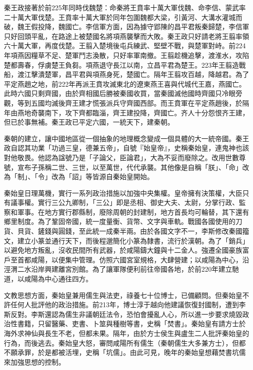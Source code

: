 秦王政接著於前225年同時伐魏楚：命秦將王賁率十萬大軍伐魏、命李信、蒙武率二十萬大軍伐楚。王賁率十萬大軍於同年包圍魏都大梁，引黃河、大溝水灌城而破，魏王假投降，魏國亡。李信軍方面，因為據守郢陳的昌平君叛秦歸楚，李信軍只好回頭平亂，在路途上被楚國名將項燕襲擊而大敗。秦王政只好請老將王翦率領六十萬大軍，再度伐楚。王翦入楚境後屯兵練武、堅壁不戰，與楚軍對峙。前224年項燕因糧草不足、楚軍鬥志渙散，只好率軍南撤。王翦趁機追擊，渡淮水，攻陷楚都壽春，俘虜楚王負芻。項燕退守長江以南，立昌平君為楚王。223年王翦造戰船，渡江擊潰楚軍，昌平君與項燕身死，楚國亡。隔年王翦攻百越，降越君。為了平定燕趙之地，前222年再派王賁攻滅東北的遼東燕王喜與代城代王嘉，燕國亡。此時六國只剩齊國，由於齊相國后勝被秦國收買，當秦國滅他國時齊國只冷眼旁觀，等到五國均滅後齊王建才慌張派兵守齊國西部。而王賁軍在平定燕趙後，於隔年由燕地奇襲南下，攻下齊都臨淄，齊王建投降，齊國亡。齐人十分怨恨齐王建，但已於事無補。秦王政已平定六國，一統天下，建秦朝。

秦朝的建立，讓中國地區從一個抽象的地理概念變成一個具體的大一統帝國。秦王政自認其功業「功過三皇，德兼五帝」，自號『始皇帝』，史稱秦始皇，連鬼神也該對他敬畏。他認為諡號乃是「子論父，臣論君」，大為不妥而廢除之。改用世數尊號，宣布子孫稱二世、三世，以至萬世，代代承襲。其他像是自稱「朕」、「命」改為「制」、「令」改為「詔」等皆源自秦始皇開始。

秦始皇日理萬機，實行一系列政治措施以加強中央集權。皇帝擁有決策權，大臣只有議事權。實行三公九卿制，「三公」即是丞相、御史大夫、太尉，分掌行政、監察和軍事。在地方實行郡縣制，廢除周朝的封建制，地方首長均可輪替，其下還有鄉里制度。為了鞏固帝國，統一度量衡、貨幣、文字與車軌。戰國各國使用的刀貨、貝貨、鏟錢與圓錢，至此統一成秦半兩。由於各國文字不一，李斯修改秦國籀文，建立小篆並通行天下，而後程邈簡化小篆為隸書，流行於漢朝。為了「銷兵」以避免地方叛亂，沒收民間所有武器，於咸陽鑄大鐘與十二金人。強遷全國豪族富戶至首都咸陽，以便集中管理。仿照六國宮室規格，大肆營建；以咸陽為中心，沿涇渭二水沿岸興建離宮別館。為了讓軍隊便利前往帝國各地，於前220年建立馳道，以咸陽為中心通往四方。

文教思想方面，秦始皇兼用儒生與法吏，祿養七十位博士，已備顧問。但秦始皇不許任何人批評他的政治措施。前213年，博士淳于越向他建議恢復封國制，遭到李斯反對。李斯還認為儒生非議朝廷法令，恐怕會擾亂人心，所以進一步要求燒毀政治性書籍，只留醫藥、吏書、卜筮與種樹等書，史稱「焚書」。秦始皇有請方士於海外求神仙與長生不老，但都未果。隔年，由於方士侯生與盧生二人批評秦始皇的行為，而後逃去。秦始皇大怒，審問咸陽所有儒生（秦朝儒生大多兼方士），但都不願承罪，於是都被活埋，史稱「坑儒」。由此可見，晚年的秦始皇想藉焚書坑儒來加強思想的控制。

